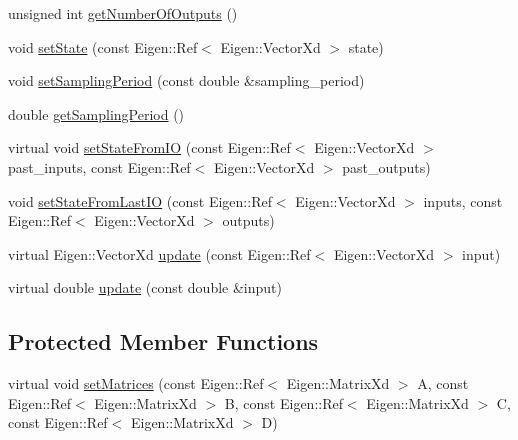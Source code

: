 \begin{DoxyCompactItemize}
unsigned int \hyperlink{classeigen__control__toolbox_1_1_discrete_state_space_a43ef1ca41a2fff19826b1d865c35e368}{get\+Number\+Of\+Outputs} ()
\item 
void \hyperlink{classeigen__control__toolbox_1_1_discrete_state_space_a822ee5d7d4bebbdf991f95dee1092775}{set\+State} (const Eigen\+::\+Ref$<$ Eigen\+::\+Vector\+Xd $>$ state)
\item 
void \hyperlink{classeigen__control__toolbox_1_1_discrete_state_space_af8e7d1aa7a8315d116e7a5dae24fcab1}{set\+Sampling\+Period} (const double \&sampling\+\_\+period)
\item 
double \hyperlink{classeigen__control__toolbox_1_1_discrete_state_space_a1c8a67c5d72db57da35d4482265ef59b}{get\+Sampling\+Period} ()
\item 
virtual void \hyperlink{classeigen__control__toolbox_1_1_discrete_state_space_a5965984530e7b3b915883d9a287e2d14}{set\+State\+From\+IO} (const Eigen\+::\+Ref$<$ Eigen\+::\+Vector\+Xd $>$ past\+\_\+inputs, const Eigen\+::\+Ref$<$ Eigen\+::\+Vector\+Xd $>$ past\+\_\+outputs)
\item 
void \hyperlink{classeigen__control__toolbox_1_1_discrete_state_space_af3f95bc7110bc5b9aa920afbe81a54b2}{set\+State\+From\+Last\+IO} (const Eigen\+::\+Ref$<$ Eigen\+::\+Vector\+Xd $>$ inputs, const Eigen\+::\+Ref$<$ Eigen\+::\+Vector\+Xd $>$ outputs)
\item 
virtual Eigen\+::\+Vector\+Xd \hyperlink{classeigen__control__toolbox_1_1_discrete_state_space_ae58e06527268253cea809554a528fdfe}{update} (const Eigen\+::\+Ref$<$ Eigen\+::\+Vector\+Xd $>$ input)
\item 
virtual double \hyperlink{classeigen__control__toolbox_1_1_discrete_state_space_afff4d00311c12501f8a72d1312d8c5ef}{update} (const double \&input)
\end{DoxyCompactItemize}
\subsection*{Protected Member Functions}
\begin{DoxyCompactItemize}
\item 
virtual void \hyperlink{classeigen__control__toolbox_1_1_discrete_state_space_a283b4074b1814d3bbc8c9cc8abb58bbe}{set\+Matrices} (const Eigen\+::\+Ref$<$ Eigen\+::\+Matrix\+Xd $>$ A, const Eigen\+::\+Ref$<$ Eigen\+::\+Matrix\+Xd $>$ B, const Eigen\+::\+Ref$<$ Eigen\+::\+Matrix\+Xd $>$ C, const Eigen\+::\+Ref$<$ Eigen\+::\+Matrix\+Xd $>$ D)
\end{DoxyCompactItemize}
